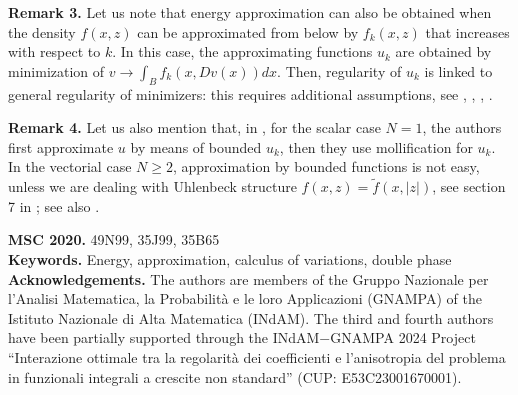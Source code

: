 \documentclass[a4paper,10pt]{article}
\theoremstyle{plain}
\theoremstyle{definition}
\numberwithin{equation}{section} \makeatletter
\begin{document}
\vskip0.5cm

\noindent
\textbf{Remark 3.}
Let us note that energy approximation can also be obtained when the density $f(x,z)$ can be approximated from below by $f_k(x,z)$ that increases with respect to $k$. In this case, the approximating functions $u_k$ are obtained by minimization of $v \to \int_B f_k(x,Dv(x)) dx$. Then, regularity of $u_k$ is linked to general regularity of minimizers: this requires additional assumptions, see \cite{DeFilippis-Leonetti-Treu}, \cite{Cupini-Guidorzi-Mascolo}, \cite{Cupini-Giannetti-Giova-Passarelli}, \cite{Carozza-Kristensen-Passarelli2014}.


\vskip0.5cm

\noindent
\textbf{Remark 4.}
Let us also mention that, in \cite{BuGwSk}, for the scalar case $N=1$, the authors first approximate $u$ by means of bounded $u_k$, then they use mollification for $u_k$. In the vectorial case $N \geq 2$, approximation by bounded functions is not easy, unless we are dealing with Uhlenbeck structure $f(x,z) = \tilde{f}(x,|z|)$, see section 7 in \cite{BuGwSk}; see also \cite{LeoPet}.


\vskip1cm


\noindent
\textbf{MSC 2020.} 49N99, 35J99, 35B65 \\ 
\textbf{Keywords.} Energy, approximation, calculus of variations, double phase \\
\textbf{Acknowledgements.} The authors are members of the Gruppo Nazionale per l’Analisi Matematica, la Probabilità e le loro Applicazioni (GNAMPA) of the Istituto Nazionale di Alta Matematica (INdAM). The third and fourth authors have been partially supported through the INdAM$-$GNAMPA 2024 Project “Interazione ottimale tra la regolarità dei coefficienti e l’anisotropia del problema in funzionali integrali a crescite non standard” (CUP: E53C23001670001).
\end{document}
